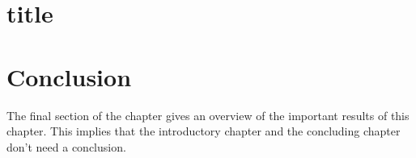 \section{title}


\section{Conclusion}
The final section of the chapter gives an overview of the important results
of this chapter. This implies that the introductory chapter and the
concluding chapter don't need a conclusion.


